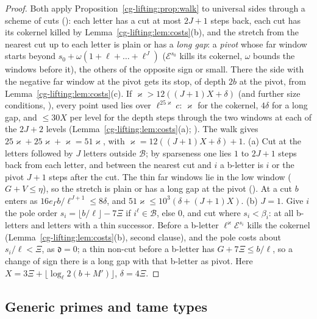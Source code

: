 \begin{proof}
Both apply Proposition~\ref{cg-lifting:prop:walk} to universal sides through a scheme of cuts
(): each
letter has a cut at most $2J+1$ steps back, each cut has its cokernel killed by
Lemma~\ref{cg-lifting:lem:costs}(b), and the stretch from the nearest cut up to each letter is plain or has a
\emph{long gap}: a \emph{pivot} whose far window starts beyond $s_0+\omega(1+\ell+\dots+\ell^J)$
($\mathcal E^{s_0}$ kills its cokernel, $\omega$ bounds the windows before it), the others of the opposite sign
or small. There the side with the negative far window at the pivot gets its stop, of depth $2b$ at
the pivot, from Lemma~\ref{cg-lifting:lem:costs}(c). If $\varkappa>12((J+1)X+\delta)$ (and further size
conditions, ), every point used lies over $\ell^{25\varkappa}c$:
$\varkappa$ for the cokernel, $4\delta$ for a long gap, and $\le30X$ per level for the depth steps
through the two windows at each of the $2J+2$ levels (Lemma~\ref{cg-lifting:lem:costs}(a);
). The walk gives
$25\varkappa+25\varkappa+\varkappa=51\varkappa$, with $\varkappa=12((J+1)X+\delta)+1$.
(a) Cut at the letters followed by $J$ letters outside $\mathcal B$; by sparseness one lies $1$ to
$2J+1$ steps back from each letter, and between the nearest cut and $i$ a b-letter is $i$ or the
pivot $J+1$ steps after the cut. The thin far windows lie in the low window ($G+V\le\eta$), so the
stretch is plain or has a long gap at the pivot
(). At a cut $b$ enters as
$16e_\Gamma b/\ell^{J+1}\le8\delta$, and $51\varkappa\le10^3(\delta+(J+1)X)$.
(b) $J=1$. Give $i$ the pole order $s_i=\lfloor b/\ell\rfloor-7\Xi$ if $i^\ell\in\mathcal B$, else $0$, and
cut where $s_i<\beta_i$: at all b-letters and letters with a thin successor. Before a b-letter
$\ell^\varkappa\mathcal E^{s_i}$ kills the cokernel (Lemma~\ref{cg-lifting:lem:costs}(b), second clause), and the pole
costs about $s_i/\ell<\Xi$, as $\mathfrak d=0$; a thin non-cut before a b-letter has $G+7\Xi\le b/\ell$, so a change
of sign there is a long gap with that b-letter as pivot. Here $X=3\Xi+\lfloor\log_\ell2(b+M')\rfloor$,
$\delta=4\Xi$.
\end{proof}

\subsection{Generic primes and tame types}\label{cg-lifting:sec:generic}

